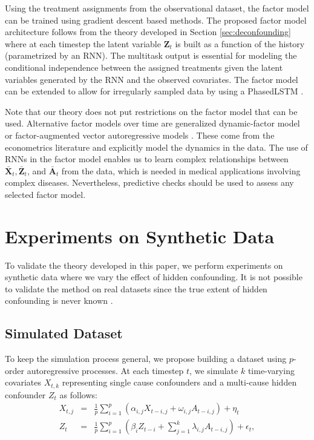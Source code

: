 \documentclass{article}
\newcommand{\vc}[1]{\mathbf{#1}}
\newcommand{\hist}[1]{\bar{\vc{#1}}}
\begin{document}
	Using the treatment assignments from the observational dataset, the factor model can be trained using gradient descent based methods. The proposed factor model architecture follows from the theory developed in Section \ref{sec:deconfounding} where at each timestep the latent variable $\vc{Z}_t$ is built as a function of the history (parametrized by an RNN). The multitask output is essential for modeling the conditional independence between the assigned treatments given the latent variables generated by the RNN and the observed covariates. The factor model can be extended to allow for irregularly sampled data by using a PhasedLSTM \cite{neil2016phased}.
	
	
	Note that our theory does not put restrictions on the factor model that can be used. Alternative factor models over time are generalized dynamic-factor model \cite{forni2000generalized, forni2005generalized} or factor-augmented vector autoregressive models \cite{bernanke2005measuring}. These come from the econometrics literature and explicitly model the dynamics in the data. The use of RNNs in the factor model enables us to learn complex relationships between $\hist{X}_t, \hist{Z}_t$, and $\hist{A}_t$ from the data, which is needed in medical applications involving complex diseases. Nevertheless, predictive checks should be used to assess any selected factor model.
	
	\section{Experiments on Synthetic Data} \label{sec:experiments_synthetic}
	
	To validate the theory developed in this paper, we perform experiments on synthetic data where we vary the effect of hidden confounding. It is not possible to validate the method on real datasets since the true extent of hidden confounding is never known \citep{wang2018blessings, louizos2017causal}.  
	
	
	\subsection{Simulated Dataset} \label{sec:simulated_data}
	
	To keep the simulation process general, we propose building a dataset using $p$-order autoregressive processes. At each timestep $t$,  we simulate $k$ time-varying covariates $X_{t, k}$ representing single cause confounders and a multi-cause hidden confounder $Z_t$ as follows:
	\begin{eqnarray}
	X_{t, j} &=& \frac{1}{p}  \sum_{i=1}^p \left( \alpha_{i, j} X_{t-i, j} + \omega_{i, j} A_{t-i, j} \right)+ \eta_t \\ 
	Z_t &=& \frac{1}{p} \sum_{i=1}^{p}  ( \beta_i Z_{t-i} + \sum_{j=1}^k \lambda_{i,j} A_{t-i, j} ) + \epsilon_t,
	\end{eqnarray}
	
\end{document}
